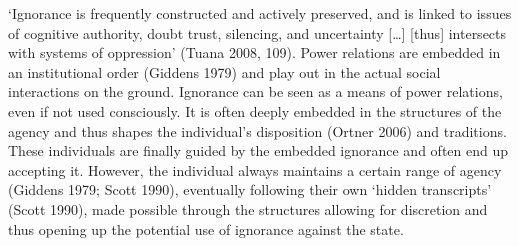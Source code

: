 \par
‘Ignorance is frequently constructed and actively preserved, and is linked to issues of cognitive authority, doubt trust, silencing, and uncertainty […] [thus] intersects with systems of oppression’ (Tuana 2008, 109). Power relations are embedded in an institutional order (Giddens 1979) and play out in the actual social interactions on the ground. Ignorance can be seen as a means of power relations, even if not used consciously. It is often deeply embedded in the structures of the agency and thus shapes the individual’s disposition (Ortner 2006) and traditions. These individuals are finally guided by the embedded ignorance and often end up accepting it. However, the individual always maintains a certain range of agency (Giddens 1979; Scott 1990), eventually following their own ‘hidden transcripts’ (Scott 1990), made possible through the structures allowing for discretion and thus opening up the potential use of ignorance against the state.

